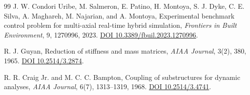 \documentclass[UTF8,11pt,a4paper]{ctexart}
\begin{document}
\begin{thebibliography}{99}
J. W. Condori Uribe, M. Salmeron, E. Patino, H. Montoya, S. J. Dyke, C. E. Silva, A. Maghareh, M. Najarian, and A. Montoya, Experimental benchmark control problem for multi-axial real-time hybrid simulation, \emph{Frontiers in Built Environment}, 9, 1270996, 2023. \href{https://doi.org/10.3389/fbuil.2023.1270996}{DOI 10.3389/fbuil.2023.1270996}.

R. J. Guyan, Reduction of stiffness and mass matrices, \emph{AIAA Journal}, 3(2), 380, 1965. \href{https://doi.org/10.2514/3.2874}{DOI 10.2514/3.2874}.

R. R. Craig Jr. and M. C. C. Bampton, Coupling of substructures for dynamic analyses, \emph{AIAA Journal}, 6(7), 1313--1319, 1968. \href{https://doi.org/10.2514/3.4741}{DOI 10.2514/3.4741}.
\end{thebibliography}
\end{document}
